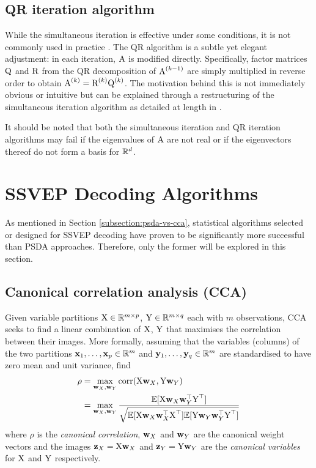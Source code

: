 \subsection{QR iteration algorithm}
\label{subsection:qr-iteration}
While the simultaneous iteration is effective under some conditions, it is not commonly used in practice \cite{panju-iterative-eig}. The QR algorithm is a subtle yet elegant adjustment: in each iteration, ${\textrm{A}}$ is modified directly. Specifically, factor matrices ${\textrm{Q}}$ and ${\textrm{R}}$ from the QR decomposition of ${\textrm{A}}^{(k-1)}$ are simply multiplied in reverse order to obtain ${\textrm{A}}^{(k)} = {\textrm{R}}^{(k)}{\textrm{Q}}^{(k)}$. The motivation behind this is not immediately obvious or intuitive but can be explained through a restructuring of the simultaneous iteration algorithm as detailed at length in \cite{panju-iterative-eig}. 

It should be noted that both the simultaneous iteration and QR iteration algorithms may fail if the eigenvalues of ${\textrm{A}}$ are not real or if the eigenvectors thereof do not form a basis for $\mathbb{R}^d$. 

\section{SSVEP Decoding Algorithms}
As mentioned in Section \ref{subsection:psda-vs-cca}, statistical algorithms selected or designed for SSVEP decoding have proven to be significantly more successful than PSDA approaches. Therefore, only the former will be explored in this section.

\subsection{Canonical correlation analysis (CCA)}
\label{section:cca-c3}
Given variable partitions ${\textrm{X}} \in \mathbb{R}^{m\times p}$, ${\textrm{Y}} \in \mathbb{R}^{m\times q}$ each with $m$ observations, CCA seeks to find a linear combination of ${\textrm{X}}$, ${\textrm{Y}}$ that maximises the correlation between their images. More formally, assuming that the variables (columns) of the two partitions ${\mathbf{x}}_1, \dots, {\mathbf{x}}_p \in \mathbb{R}^{m}$ and ${\mathbf{y}}_1, \dots, {\mathbf{y}}_q \in \mathbb{R}^{m}$ are standardised to have zero mean and unit variance, find
\begin{align}
    \rho &= \max_{{\mathbf{w}}_X, {\mathbf{w}}_Y} \textrm{corr}({\textrm{X}} {\mathbf{w}}_X, {\textrm{Y}} {\mathbf{w}}_Y) \\
    &= \max_{{\mathbf{w}}_X, {\mathbf{w}}_Y} \frac{{\mathbb{E}}[{\textrm{X}} {\mathbf{w}}_X{\mathbf{w}}_Y^\top{\textrm{Y}}^\top ]}{\sqrt{{\mathbb{E}}[{\textrm{X}} {\mathbf{w}}_X{\mathbf{w}}_X^\top{\textrm{X}}^\top]{\mathbb{E}}[{\textrm{Y}} {\mathbf{w}}_Y{\mathbf{w}}_Y^\top{\textrm{Y}}^\top]}}
    \label{eq:cca-corr-objective}
\end{align}
where $\rho$ is the \textit{canonical correlation}, ${\mathbf{w}}_X$ and ${\mathbf{w}}_Y$ are the canonical weight vectors and the images ${\mathbf{z}}_X = {\textrm{X}}{\mathbf{w}}_X$ and ${\mathbf{z}}_Y = {\textrm{Y}}{\mathbf{w}}_Y$ are the \textit{canonical variables} for ${\textrm{X}}$ and ${\textrm{Y}}$ respectively.

